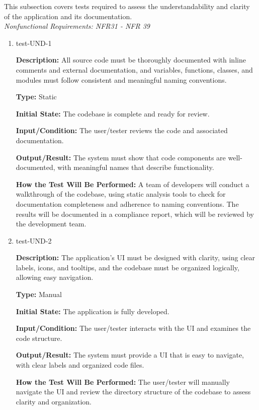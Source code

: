 \documentclass[12pt, titlepage]{article}
\begin{document}
This subsection covers tests required to assess the understandability and clarity of the application and its documentation. \\
\textit{Nonfunctional Requirements: NFR31 - NFR 39}

\begin{enumerate}

\item{test-UND-1\\}

\textbf{Description:} All source code must be thoroughly documented with inline comments and external documentation, and variables, functions, classes, and modules must follow consistent and meaningful naming conventions.

\textbf{Type:} Static
					
\textbf{Initial State:} The codebase is complete and ready for review.
					
\textbf{Input/Condition:} The user/tester reviews the code and associated documentation.
					
\textbf{Output/Result:} The system must show that code components are well-documented, with meaningful names that describe functionality.
					
\textbf{How the Test Will Be Performed:} A team of developers will conduct a walkthrough of the codebase, using static analysis tools to check for documentation completeness and adherence to naming conventions. The results will be documented in a compliance report, which will be reviewed by the development team.

\item{test-UND-2\\}

\textbf{Description:} The application's UI must be designed with clarity, using clear labels, icons, and tooltips, and the codebase must be organized logically, allowing easy navigation.

\textbf{Type:} Manual
					
\textbf{Initial State:} The application is fully developed.
					
\textbf{Input/Condition:} The user/tester interacts with the UI and examines the code structure.
					
\textbf{Output/Result:} The system must provide a UI that is easy to navigate, with clear labels and organized code files.
					
\textbf{How the Test Will Be Performed:} The user/tester will manually navigate the UI and review the directory structure of the codebase to assess clarity and organization.


\end{enumerate}
\end{document}
